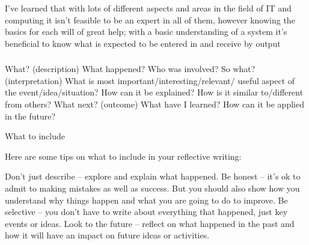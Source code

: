 I've learned that with lots of different aspects and areas in the field
of IT and computing it isn't feasible to be an expert in all of them,
however knowing the basics for each will of great help; with a basic
understanding of a system it's beneficial to know what is expected to be
entered in and receive by output

\subsubsection{}\label{section}

What? (description) What happened? Who was involved? So what?
(interpretation) What is most important/interesting/relevant/ useful
aspect of the event/idea/situation? How can it be explained? How is it
similar to/different from others? What next? (outcome) What have I
learned? How can it be applied in the future?

What to include

Here are some tips on what to include in your reflective writing:

Don't just describe -- explore and explain what happened. Be honest --
it's ok to admit to making mistakes as well as success. But you should
also show how you understand why things happen and what you are going to
do to improve. Be selective -- you don't have to write about everything
that happened, just key events or ideas. Look to the future -- reflect
on what happened in the past and how it will have an impact on future
ideas or activities.
